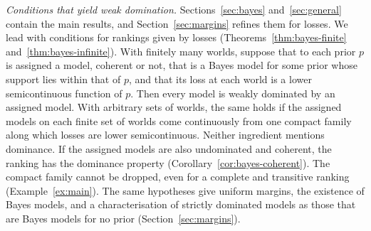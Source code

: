 \documentclass[11pt]{article}
\theoremstyle{definition}
\theoremstyle{remark}
\begin{document}
\emph{Conditions that yield weak domination.} Sections~\ref{sec:bayes} and~\ref{sec:general} contain the main results, and Section~\ref{sec:margins} refines them for losses. We lead with conditions for rankings given by losses (Theorems~\ref{thm:bayes-finite} and~\ref{thm:bayes-infinite}). With finitely many worlds, suppose that to each prior $p$ is assigned a model, coherent or not, that is a Bayes model for some prior whose support lies within that of $p$, and that its loss at each world is a lower semicontinuous function of $p$. Then every model is weakly dominated by an assigned model. With arbitrary sets of worlds, the same holds if the assigned models on each finite set of worlds come continuously from one compact family along which losses are lower semicontinuous. Neither ingredient mentions dominance. If the assigned models are also undominated and coherent, the ranking has the dominance property (Corollary~\ref{cor:bayes-coherent}). The compact family cannot be dropped, even for a complete and transitive ranking (Example~\ref{ex:main}). The same hypotheses give uniform margins, the existence of Bayes models, and a characterisation of strictly dominated models as those that are Bayes models for no prior (Section~\ref{sec:margins}).
\end{document}
